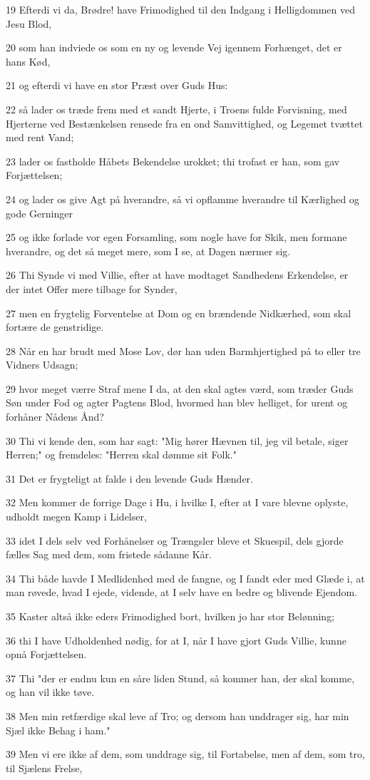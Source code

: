 \par 19 Efterdi vi da, Brødre! have Frimodighed til den Indgang i Helligdommen ved Jesu Blod,
\par 20 som han indviede os som en ny og levende Vej igennem Forhænget, det er hans Kød,
\par 21 og efterdi vi have en stor Præst over Guds Hus:
\par 22 så lader os træde frem med et sandt Hjerte, i Troens fulde Forvisning, med Hjerterne ved Bestænkelsen rensede fra en ond Samvittighed, og Legemet tvættet med rent Vand;
\par 23 lader os fastholde Håbets Bekendelse urokket; thi trofast er han, som gav Forjættelsen;
\par 24 og lader os give Agt på hverandre, så vi opflamme hverandre til Kærlighed og gode Gerninger
\par 25 og ikke forlade vor egen Forsamling, som nogle have for Skik, men formane hverandre, og det så meget mere, som I se, at Dagen nærmer sig.
\par 26 Thi Synde vi med Villie, efter at have modtaget Sandhedens Erkendelse, er der intet Offer mere tilbage for Synder,
\par 27 men en frygtelig Forventelse at Dom og en brændende Nidkærhed, som skal fortære de genstridige.
\par 28 Når en har brudt med Mose Lov, dør han uden Barmhjertighed på to eller tre Vidners Udsagn;
\par 29 hvor meget værre Straf mene I da, at den skal agtes værd, som træder Guds Søn under Fod og agter Pagtens Blod, hvormed han blev helliget, for urent og forhåner Nådens Ånd?
\par 30 Thi vi kende den, som har sagt: "Mig hører Hævnen til, jeg vil betale, siger Herren;" og fremdeles: "Herren skal dømme sit Folk."
\par 31 Det er frygteligt at falde i den levende Guds Hænder.
\par 32 Men kommer de forrige Dage i Hu, i hvilke I, efter at I vare blevne oplyste, udholdt megen Kamp i Lidelser,
\par 33 idet I dels selv ved Forhånelser og Trængsler bleve et Skuespil, dels gjorde fælles Sag med dem, som fristede sådanne Kår.
\par 34 Thi både havde I Medlidenhed med de fangne, og I fandt eder med Glæde i, at man røvede, hvad I ejede, vidende, at I selv have en bedre og blivende Ejendom.
\par 35 Kaster altså ikke eders Frimodighed bort, hvilken jo har stor Belønning;
\par 36 thi I have Udholdenhed nødig, for at I, når I have gjort Guds Villie, kunne opnå Forjættelsen.
\par 37 Thi "der er endnu kun en såre liden Stund, så kommer han, der skal komme, og han vil ikke tøve.
\par 38 Men min retfærdige skal leve af Tro; og dersom han unddrager sig, har min Sjæl ikke Behag i ham."
\par 39 Men vi ere ikke af dem, som unddrage sig, til Fortabelse, men af dem, som tro, til Sjælens Frelse,

